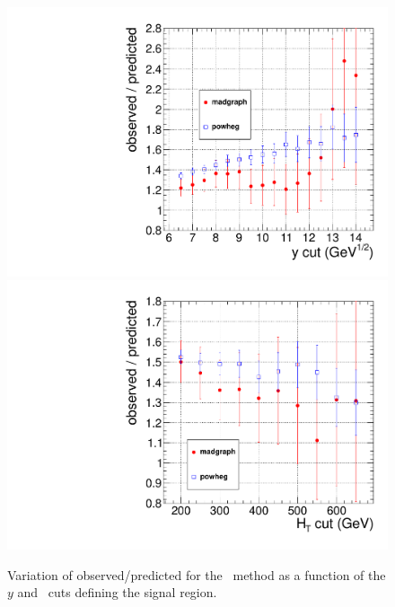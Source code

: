 \begin{figure}[hbt]
\begin{center}
\includegraphics[width=0.48\linewidth]{plots/victory_yvary.pdf}
\includegraphics[width=0.48\linewidth]{plots/victory_htvary.pdf}
\caption{\label{fig:victory}\protect Variation of observed/predicted
for the \ptll\ method as a function of the $y$ and \Ht\ cuts defining
the signal region.}
\end{center}
\end{figure}


